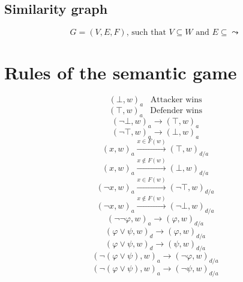 \documentclass[a4paper,american]{paper}
\begin{document}
\subsection{Similarity graph}
\begin{equation}
	G = (V,E,F)\text{, such that }V \subseteq W\text{ and }E \subseteq \leadsto
\end{equation}

\section*{Rules of the semantic game}

\begin{figure}[H]
	\centering
	\begin{equation}
		(\bot ,w)_{a}\hspace{10pt}\text{Attacker wins}
	\end{equation}
	\begin{equation}
		(\top ,w)_{a}\hspace{10pt}\text{Defender wins}
	\end{equation}
	\begin{equation}
		(\neg\bot ,w)_{a} \rightarrow (\top ,w)_{a}
	\end{equation}
	\begin{equation}
		(\neg\top ,w)_{a} \rightarrow (\bot ,w)_{a}
	\end{equation}
	\begin{equation}
		(x,w)_{a}\xrightarrow{x\in F(w)}(\top ,w)_{d/a}
	\end{equation}
	\begin{equation}
		(x,w)_{a}\xrightarrow{x\not\in F(w)}(\bot ,w)_{d/a}
	\end{equation}
	\begin{equation}
		(\neg x,w)_{a}\xrightarrow{x\in F(w)}(\neg\top ,w)_{d/a}
	\end{equation}
	\begin{equation}
		(\neg x,w)_{a}\xrightarrow{x\not\in F(w)}(\neg\bot ,w)_{d/a}
	\end{equation}
	\begin{equation}
		(\neg\neg\varphi ,w)_{a}\rightarrow (\varphi ,w)_{d/a}
	\end{equation}
	\begin{equation}
		(\varphi\vee\psi ,w)_d\rightarrow (\varphi ,w)_{d/a}
	\end{equation}
	\begin{equation}
		(\varphi\vee\psi ,w)_d\rightarrow (\psi ,w)_{d/a}
	\end{equation}
	\begin{equation}
		(\neg (\varphi\vee\psi ),w)_a\rightarrow (\neg\varphi ,w)_{d/a}
	\end{equation}
	\begin{equation}
		(\neg (\varphi\vee\psi ),w)_a\rightarrow (\neg\psi ,w)_{d/a}
	\end{equation}
	

\end{figure}
\end{document}
